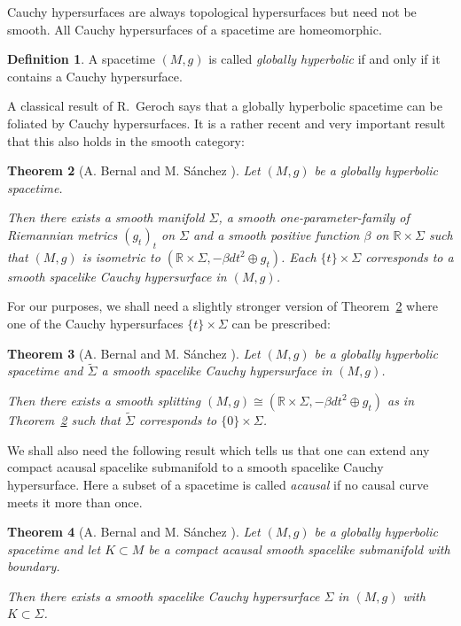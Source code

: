 \documentclass[a4paper,11pt]{amsart}
\newtheorem{thm}{Theorem}[section]
\theoremstyle{definition}
\newtheorem{definition}[thm]{Definition}
\begin{document}
Cauchy hypersurfaces are always topological hypersurfaces but need not be smooth.
All Cauchy hypersurfaces of a spacetime are homeomorphic.

\begin{definition}\label{def-globhyp}
A spacetime $(M,g)$ is called \emph{globally hyperbolic} if and only if it contains a Cauchy hypersurface.
\end{definition}

A classical result of R.~Geroch \cite{Geroch70} says that a globally hyperbolic spacetime can be foliated by Cauchy hypersurfaces.
It is a rather recent and very important result that this also holds in the smooth category:

\begin{thm}[{\rm A. Bernal and M. S\'anchez \cite[Thm.~1.1]{BS}}]\label{tBernalSanchez}
Let $(M,g)$ be a globally hyperbolic spacetime.

Then there exists a smooth manifold $\Sigma$, a smooth one-parameter-family of Riemannian metrics $(g_t)_t$ on $\Sigma$ and a smooth positive function $\beta$ on ${\mathbb{R}}\times\Sigma$ such that $(M,g)$ is isometric to $({\mathbb{R}}\times\Sigma,-\beta dt^2\oplus g_t)$.
Each $\{t\}\times\Sigma$ corresponds to a smooth spacelike Cauchy hypersurface in $(M,g)$.
\end{thm}

For our purposes, we shall need a slightly stronger version of Theorem~\ref{tBernalSanchez} where one of the Cauchy hypersurfaces $\{t\}\times\Sigma$ can be prescribed:

\begin{thm}[{\rm A. Bernal and M. S\'anchez \cite[Thm.~1.2]{BS2}}]\label{tBernalSanchez2}
Let $(M,g)$ be a globally hyperbolic spacetime and $\tilde{\Sigma}$ a smooth spacelike Cauchy hypersurface in $(M,g)$.

Then there exists a smooth splitting $(M,g)\cong({\mathbb{R}}\times\Sigma,-\beta dt^2\oplus g_t)$ as in Theorem~\ref{tBernalSanchez} such that $\tilde{\Sigma}$ corresponds to $\{0\}\times\Sigma$.
\end{thm}

We shall also need the following result which tells us that one can extend any compact acausal spacelike submanifold to a smooth spacelike Cauchy hypersurface.
Here a subset of a spacetime is called \emph{acausal} if no causal curve meets it more than once.

\begin{thm}[{\rm A. Bernal and M. S\'anchez \cite[Thm.~1.1]{BS2}}]\label{tBernalSanchez3}
Let $(M,g)$ be a globally hyperbolic spacetime and let $K\subset M$ be a compact acausal smooth spacelike submanifold with boundary.

Then there exists a smooth spacelike Cauchy hypersurface $\Sigma$ in $(M,g)$ with $K\subset\Sigma$.
\end{thm}
\end{document}
